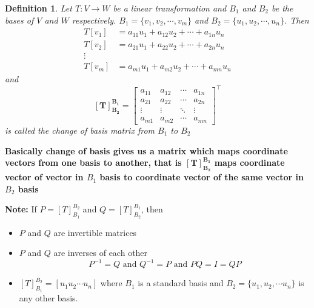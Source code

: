\documentclass[a4paper, titlepage]{article}
\newtheorem{definition}{Definition}[section]
\begin{document}
        \begin{definition}
            Let $T: V \to W$ be a linear transformation and $B_1$ 
            and $B_2$ be the bases of $V$ and $W$ respectively. 
            $B_1 = \{ v_1, v_2, \cdots, v_m \}$ and $B_2 = \{ u_1, 
            u_2, \cdots, u_n \}$.
            Then 
            \begin{align*}
                T[v_1] &= a_{11}u_1 + a_{12}u_2 + \cdots + a_{1n}u_n \\
                T[v_2] &= a_{21}u_1 + a_{22}u_2 + \cdots + a_{2n}u_n \\
                \vdots \\
                T[v_m] &= a_{m1}u_1 + a_{m2}u_2 + \cdots + a_{mn}u_n
            \end{align*}
            and
            $$
                \bm{[T]_{B_2}^{B_1}} = 
                        \begin{bmatrix}
                            a_{11} & a_{12} & \cdots & a_{1n} \\
                            a_{21} & a_{22} & \cdots & a_{2n} \\
                            \vdots & \vdots & \ddots & \vdots \\
                            a_{m1} & a_{m2} & \cdots & a_{mn}
                        \end{bmatrix} ^ \intercal
            $$ is called the change of basis matrix from $B_1$
            to $B_2$
        \end{definition}
        
        \noindent \textbf{Basically change of basis gives us a 
        matrix which maps coordinate vectors from one basis to 
        another, that is $\bm{[T]_{B_2}^{B_1}}$ maps coordinate
        vector of vector in $B_1$ basis to coordinate vector of the
        same vector in $B_2$ basis}

        \vspace*{1em}
        \noindent\textbf{Note: }If $P = [T]_{B_1}^{B_2}$ and $Q =
        [T]_{B_2}^{B_1}$, then
        \begin{itemize}
            \item $P$ and $Q$ are invertible matrices
            \item $P$ and $Q$ are inverses of each other
            $$P^{-1} = Q \text{ and } Q^{-1} = P \text{ and }
            PQ = I = QP $$
            \item $[T]_{B_1}^{B_2} = [u_1 u_2 \cdots u_n]$ where
            $B_1$ is a standard basis and $B_2 = \{ u_1, u_2, \cdots u_n \}$ 
            is any other basis.
        \end{itemize}
    
\end{document}
